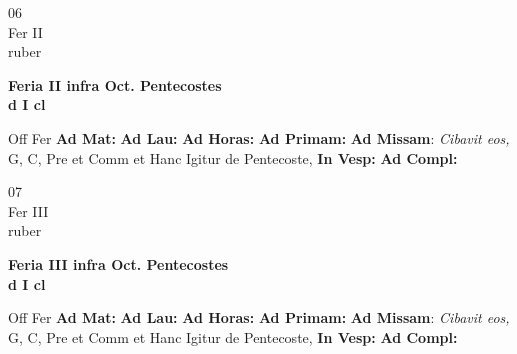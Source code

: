 \documentclass[10pt, openany]{book}
\begin{document}
        \begin{center}
            \begin{minipage}{3.5in}
                \vspace{2em}
                \begin{minipage}{0.5in}
                    {\Huge 06} \\
                    {\normalsize Fer II} \\
                    {\normalsize ruber}
                \end{minipage}
                \begin{minipage}{3.0in}
                    \textbf{ \large Feria II infra Oct. Pentecostes \\
                    \textnormal{\normalsize d I cl}} \\ 
                \end{minipage}
                \begin{justify}Off Fer
                    \textbf{Ad Mat: }
                    \textbf{Ad Lau: }
                    \textbf{Ad Horas: }
                    \textbf{Ad Primam: }\textbf{Ad Missam}: \textit{Cibavit eos,} G, C, Pre et Comm et Hanc Igitur de Pentecoste,  
                    \textbf{In Vesp: }
                    \textbf{Ad Compl: }
                \end{justify}
            \end{minipage}
        \end{center}
    
        \begin{center}
            \begin{minipage}{3.5in}
                \vspace{2em}
                \begin{minipage}{0.5in}
                    {\Huge 07} \\
                    {\normalsize Fer III} \\
                    {\normalsize ruber}
                \end{minipage}
                \begin{minipage}{3.0in}
                    \textbf{ \large Feria III infra Oct. Pentecostes \\
                    \textnormal{\normalsize d I cl}} \\ 
                \end{minipage}
                \begin{justify}Off Fer
                    \textbf{Ad Mat: }
                    \textbf{Ad Lau: }
                    \textbf{Ad Horas: }
                    \textbf{Ad Primam: }\textbf{Ad Missam}: \textit{Cibavit eos,} G, C, Pre et Comm et Hanc Igitur de Pentecoste,  
                    \textbf{In Vesp: }
                    \textbf{Ad Compl: }
                \end{justify}
            \end{minipage}
        \end{center}
    
\end{document}
